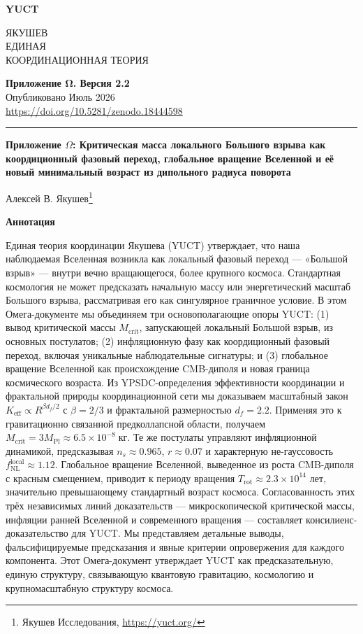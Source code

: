 \documentclass[11pt,a4paper]{article}
\newcommand{\Keff}{K_{\mathrm{eff}}}
\newcommand{\makeheader}{%
	\noindent
	\begin{minipage}{0.17\textwidth}
		\raggedright
		{\sffamily\bfseries\color{skyblue}\fontsize{46}{46}\selectfont YUCT}%
	\end{minipage}%
	\hspace{30pt}
	\begin{minipage}{0.32\textwidth}
		\raggedright
		{\sffamily\fontsize{11}{13}\selectfont ЯКУШЕВ\\ ЕДИНАЯ\\ КООРДИНАЦИОННАЯ ТЕОРИЯ}%
	\end{minipage}%
	\hfill
	\begin{minipage}{0.45\textwidth}
		\raggedleft
		{\sffamily\bfseries Приложение Ω. Версия 2.2}\\
		{\sffamily Опубликовано Июль 2026}\\
		{\sffamily\footnotesize \url{https://doi.org/10.5281/zenodo.18444598}}%
	\end{minipage}
	\par\vspace{5pt}
	\noindent\textcolor{gold}{\rule{\textwidth}{1.6pt}}
	\par\vspace{0pt}
}
\begin{document}
	\renewcommand{\thepage}{\arabic{page}}
	\thispagestyle{firstpage}
	\makeheader
	
	\vspace{0cm}
	{\LARGE\bfseries Приложение \(\Omega\): Критическая масса локального Большого взрыва как коордиционный фазовый переход, глобальное вращение Вселенной и её новый минимальный возраст из дипольного радиуса поворота \par}
	\vspace{0.2cm}
	
	{\large Алексей В. Якушев\footnote{Якушев Исследования, \url{https://yuct.org/}}} \\
	\vspace{0.0cm}
	
	{\color{darkblue}\textbf{\LARGE Аннотация}} \par
	{\large
		\noindent
		Единая теория координации Якушева (YUCT) утверждает, что наша наблюдаемая Вселенная возникла как локальный фазовый переход — «Большой взрыв» — внутри вечно вращающегося, более крупного космоса. Стандартная космология не может предсказать начальную массу или энергетический масштаб Большого взрыва, рассматривая его как сингулярное граничное условие. В этом Омега-документе мы объединяем три основополагающие опоры YUCT: (1) вывод критической массы \(M_{\mathrm{crit}}\), запускающей локальный Большой взрыв, из основных постулатов; (2) инфляционную фазу как коордиционный фазовый переход, включая уникальные наблюдательные сигнатуры; и (3) глобальное вращение Вселенной как происхождение CMB-диполя и новая граница космического возраста. Из YPSDC-определения эффективности координации и фрактальной природы координационной сети мы доказываем масштабный закон \(\Keff \propto R^{\beta d_f/2}\) с \(\beta = 2/3\) и фрактальной размерностью \(d_f = 2.2\). Применяя это к гравитационно связанной предколлапсной области, получаем \(M_{\mathrm{crit}} = 3 M_{\mathrm{Pl}} \approx 6.5 \times 10^{-8}\;\text{кг}\). Те же постулаты управляют инфляционной динамикой, предсказывая \(n_s \approx 0.965\), \(r \approx 0.07\) и характерную не-гауссовость \(f_{\mathrm{NL}}^{\mathrm{local}} \approx 1.12\). Глобальное вращение Вселенной, выведенное из роста CMB-диполя с красным смещением, приводит к периоду вращения \(T_{\mathrm{rot}} \approx 2.3 \times 10^{14}\) лет, значительно превышающему стандартный возраст космоса. Согласованность этих трёх независимых линий доказательств — микроскопической критической массы, инфляции ранней Вселенной и современного вращения — составляет консилиенс-доказательство для YUCT. Мы представляем детальные выводы, фальсифицируемые предсказания и явные критерии опровержения для каждого компонента. Этот Омега-документ утверждает YUCT как предсказательную, единую структуру, связывающую квантовую гравитацию, космологию и крупномасштабную структуру космоса.
	}
	
\end{document}

